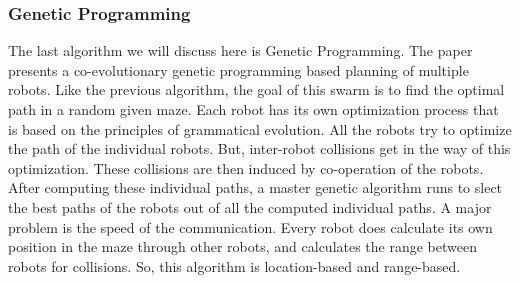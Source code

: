
\subsubsection{Genetic Programming}
The last algorithm we will discuss here is Genetic Programming. \cite{kala2012multi}
The paper presents a co-evolutionary genetic programming based planning of multiple robots. 
Like the previous algorithm, the goal of this swarm is to find the optimal path in a random given maze.
Each robot has its own optimization process that is based on the principles of grammatical evolution. 
All the robots try to optimize the path of the individual robots. 
But, inter-robot collisions get in the way of this optimization. 
These collisions are then induced by co-operation of the robots. 
After computing these individual paths, a master genetic algorithm runs to slect the best paths of the robots out of all the computed individual paths. 
A major problem is the speed of the communication.
Every robot does calculate its own position in the maze through other robots, and calculates the range between robots for collisions.
So, this algorithm is location-based and range-based.


